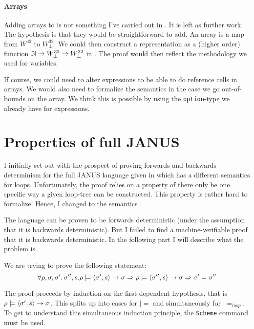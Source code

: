 \paragraph{Arrays}

Adding arrays to \januso{} is not something I've carried out in
\coq{}. It is left as further work. The hypothesis is that they would
be straightforward to add. An array is a map from $W^{32}$ to
$W^{32}_{\perp}$. We could then construct a representation as a
(higher order) function $\mathbb{N} \to W^{32}_{\perp} \to W^{32}_{\perp}$ in
\coq{}. The proof would then reflect the methodology we used for
variables.

If course, we could need to alter expressions to be able to do
reference cells in arrays. We would also need to formalize the
semantics in the case we go out-of-bounds on the array. We think this
is possible by using the \texttt{option}-type we already have for
expressions.

\section{Properties of full JANUS}
\label{sec:prop-full-janus}

I initially set out with the prospect of proving forwards and
backwards determinism for the full JANUS language given in
\cite{yokoyama.gluck:reversible} which has a different semantics for
loops. Unfortunately, the proof relies on a property of there only be
one specific way a given loop-tree can be constructed. This property
is rather hard to formalize. Hence, I changed to the semantics
\cite{yokoyama.axelsen.ea:principles}.

The language can be proven to be forwards deterministic (under the
assumption that it is backwards deterministic). But I failed to find a
machine-verifiable proof that it is backwards deterministic. In the
following part I will describe what the problem is.

We are trying to prove the following statement:
\begin{equation*}
  \forall \rho, \sigma, \sigma', \sigma'', s .
  \rho |= \langle \sigma', s \rangle -> \sigma => \rho |=
  \langle \sigma'', s \rangle -> \sigma => \sigma' = \sigma''
\end{equation*}

The proof proceeds by induction on the first dependent hypothesis,
that is $\rho |= \langle \sigma', s \rangle -> \sigma$. This splits up into
cases for $|=$ and simultaneously for $|=_{loop}$. To get \coq{} to
understand this simultaneous induction principle, the \texttt{Scheme}
command must be used.


